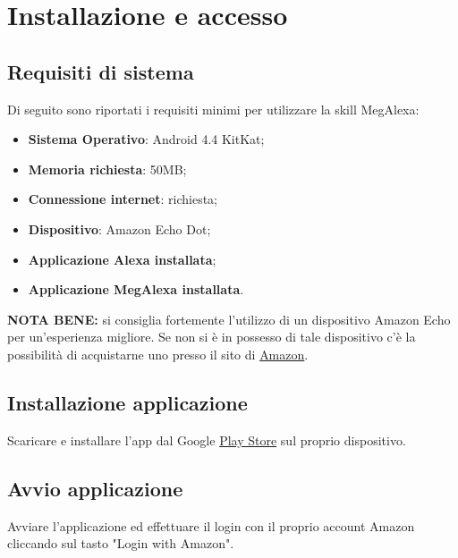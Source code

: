 \chapter{Installazione e accesso}
\label{Installazione}

\section{Requisiti di sistema}
Di seguito sono riportati i requisiti minimi per utilizzare la skill MegAlexa:

\begin{itemize}
	\item \textbf{Sistema Operativo}: Android 4.4 KitKat;
	\item \textbf{Memoria richiesta}: 50MB;
	\item \textbf{Connessione internet}: richiesta;
	\item \textbf{Dispositivo}: Amazon Echo Dot;
	\item \textbf{Applicazione Alexa installata};
	\item \textbf{Applicazione MegAlexa installata}.
	
	
\end{itemize}

\textbf{NOTA BENE:} si consiglia fortemente l'utilizzo di un dispositivo Amazon Echo per un'esperienza migliore. Se non si è in possesso di tale dispositivo c'è la possibilità di acquistarne uno presso il sito di \href{https://www.amazon.it}{Amazon}.

\section{Installazione applicazione}
Scaricare e installare l'app dal Google \href{https://play.google.com/store/apps?hl=it}{Play Store} sul proprio dispositivo.
\newpage
\section{Avvio applicazione}

Avviare l'applicazione ed effettuare il login con il proprio account Amazon cliccando sul tasto "Login with Amazon".

